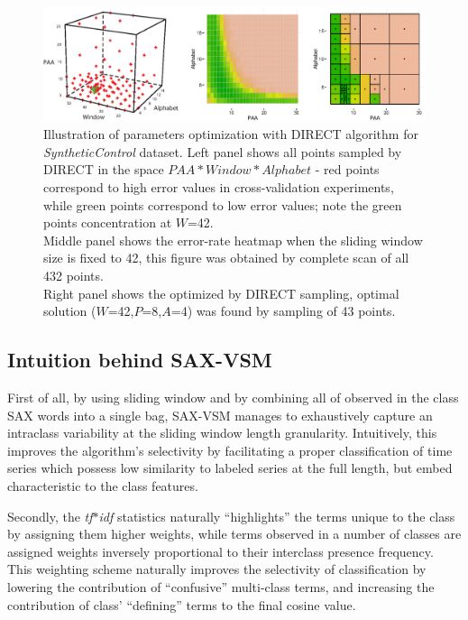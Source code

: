 \documentclass{llncs}
\begin{document}
\begin{figure}[tbp]
   \centering
   \includegraphics[width=120mm]{figures/figure_direct.eps}
   \caption{Illustration of parameters
optimization with DIRECT algorithm for \textit{SyntheticControl} dataset. Left panel shows
all points sampled by DIRECT in the space $PAA*Window*Alphabet$ - red points correspond to high
error values in cross-validation experiments, while green points correspond to low error values;
note the green points concentration at $W$=42.\\ 
Middle panel shows the error-rate heatmap when the sliding window size is fixed to 42, this figure
was obtained by complete scan of all 432 points.\\ 
Right panel shows the optimized by DIRECT sampling,
optimal solution ($W$=42,$P$=8,$A$=4) was found by sampling of 43 points.}
   \label{fig:direct-sampling}
\end{figure}
   
\subsection{Intuition behind SAX-VSM}
First of all, by using sliding window and by combining all of observed in the class SAX words into
a 
single bag, SAX-VSM manages to exhaustively capture an intraclass variability at the sliding window 
length granularity. Intuitively, this improves the algorithm's selectivity by facilitating a proper 
classification of time series which possess low similarity to labeled series at the full length, 
but embed characteristic to the class features.

Secondly, the \textit{tf$\ast$idf} statistics naturally ``highlights'' the terms unique to the
class by assigning them higher weights, while terms observed in a number of classes are assigned
weights inversely proportional to their interclass presence frequency. This weighting scheme
naturally improves the selectivity of classification by  lowering the contribution of ``confusive''
multi-class terms, and  increasing  the contribution  of  class' ``defining'' terms to the final
cosine value.   
   
\end{document}
